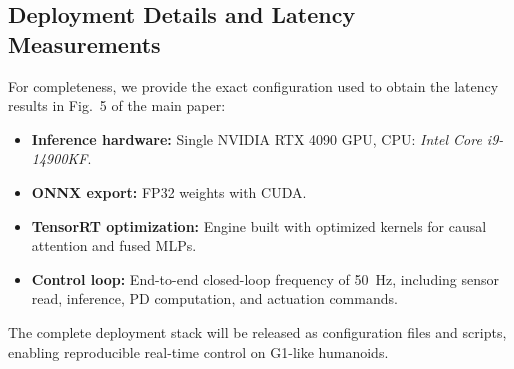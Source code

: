 \documentclass{llmxive}
\begin{document}
\subsection{Deployment Details and Latency Measurements}
\label{subsec:deployment_details}

For completeness, we provide the exact configuration used to obtain the latency results in Fig.~5 of the main paper:
\begin{itemize}[leftmargin=1.5em]
    \item \textbf{Inference hardware:} Single NVIDIA RTX 4090 GPU, CPU: \emph{Intel Core i9-14900KF}.
    \item \textbf{ONNX export:} FP32 weights with CUDA.
    \item \textbf{TensorRT optimization:} Engine built with optimized kernels for causal attention and fused MLPs.
    \item \textbf{Control loop:} End-to-end closed-loop frequency of 50~Hz, including sensor read, inference, PD computation, and actuation commands.
\end{itemize}

The complete deployment stack will be released as configuration files and scripts, enabling reproducible real-time control on G1-like humanoids.
\end{document}

